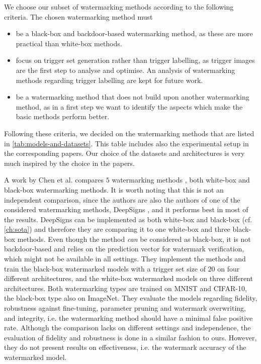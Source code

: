 We choose our subset of watermarking methods according to the following criteria. The chosen watermarking method must
\begin{itemize}
    \item be a black-box and backdoor-based watermarking method, as these are more practical than white-box methods.
    \item focus on trigger set generation rather than trigger labelling, as trigger images are the first step to analyse and optimise. An analysis of watermarking methods regarding trigger labelling are kept for future work.
    \item be a watermarking method that does not build upon another watermarking method, as in a first step we want to identify the aspects which make the basic methods perform better.
\end{itemize}



Following these criteria, we decided on the watermarking methods that are listed in \cref{tab:models-and-datasets}. This table includes also the experimental setup in the corresponding papers. Our choice of the datasets and architectures is very much inspired by the choice in the papers.


A work by Chen et al. \cite{chen_performance_2018} compares $5$ watermarking methods \cite{uchida_embedding_2017,rouhani_deepsigns_2019, zhang_protecting_2018, adi_turning_2018, merrer_adversarial_2019}, both white-box and black-box watermarking methods. It is worth noting that this is not an independent comparison, since the authors are also the authors of one of the considered watermarking methods, DeepSigns \cite{rouhani_deepsigns_2019}, and it performs best in most of the results. DeepSigns can be implemented as both white-box and black-box (cf. \cref{ch:sota}) and therefore they are comparing it to one white-box and three black-box methods. Even though the method \textit{can} be considered as black-box, it is not backdoor-based and relies on the prediction vector for watermark verification, which might not be available in all settings. They implement the methods and train the black-box watermarked models with a trigger set size of $20$ on four different architectures, and the white-box watermarked models on three different architectures. Both watermarking types are trained on MNIST and CIFAR-10, the black-box type also on ImageNet. They evaluate the models regarding fidelity, robustness against fine-tuning, parameter pruning and watermark overwriting, and integrity, i.e. the watermarking method should have a minimal false positive rate. Although the comparison lacks on different settings and independence, the evaluation of fidelity and robustness is done in a similar fashion to ours. However, they do not present results on effectiveness, i.e. the watermark accuracy of the watermarked model.

